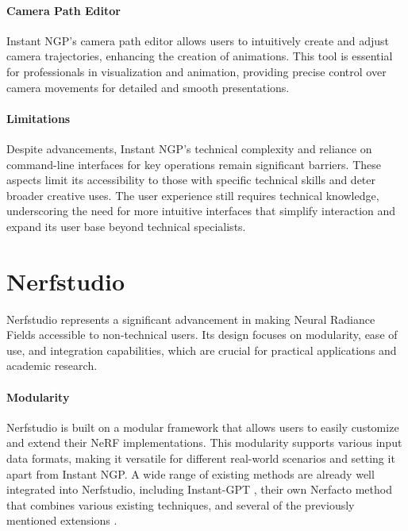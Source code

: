 \paragraph{Camera Path Editor}
Instant NGP's camera path editor allows users to intuitively create and adjust camera trajectories, enhancing the creation of animations.
This tool is essential for professionals in visualization and animation, providing precise control over camera movements for detailed and smooth presentations.

\paragraph{Limitations}
Despite advancements, Instant NGP's technical complexity and reliance on command-line interfaces for key operations remain significant barriers.
These aspects limit its accessibility to those with specific technical skills and deter broader creative uses.
The user experience still requires technical knowledge, underscoring the need for more intuitive interfaces that simplify interaction and expand its user base beyond technical specialists.

\section{Nerfstudio}
\label{sec:related:nerfstudio}

Nerfstudio \cite{tancik_nerfstudio_2023} represents a significant advancement in making Neural Radiance Fields accessible to non-technical users.
Its design focuses on modularity, ease of use, and integration capabilities, which are crucial for practical applications and academic research.

\paragraph{Modularity}
Nerfstudio is built on a modular framework that allows users to easily customize and extend their NeRF implementations.
This modularity supports various input data formats, making it versatile for different real-world scenarios and setting it apart from Instant NGP.
A wide range of existing methods are already well integrated into Nerfstudio, including Instant-GPT \cite{muller_instant_2022}, their own Nerfacto \cite{noauthor_nerfacto_nodate} method that combines various existing techniques, and several of the previously mentioned extensions \cite{haque_instruct-nerf2nerf_2023,jan-niklas_dihlmann_signerf_2024}.

